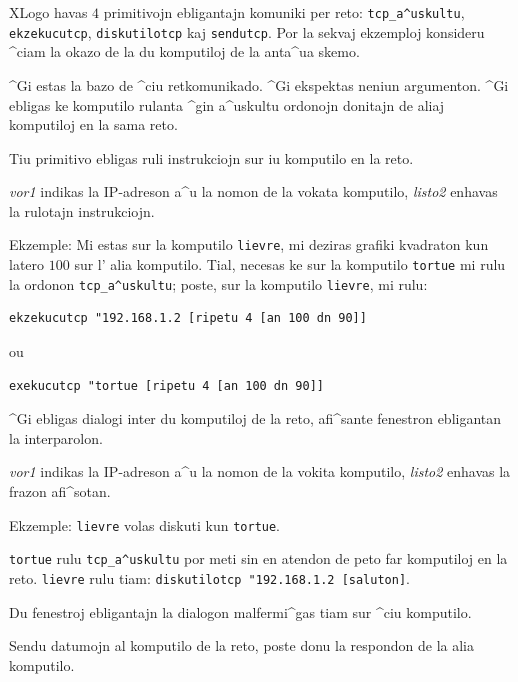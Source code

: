 XLogo havas $4$ primitivojn ebligantajn komuniki per reto:
\texttt{tcp\_a^uskultu}, \texttt{ekzekucutcp}, \texttt{diskutilotcp}
kaj \texttt{sendutcp}.  Por la sekvaj ekzemploj konsideru ^ciam la
okazo de la du komputiloj de la anta^ua skemo.


^Gi estas la bazo de ^ciu retkomunikado.  ^Gi ekspektas neniun
argumenton.  ^Gi ebligas ke komputilo rulanta ^gin a^uskultu ordonojn
donitajn de aliaj komputiloj en la sama reto.


Tiu primitivo ebligas ruli instrukciojn sur iu komputilo en la reto.

\textit{vor1} indikas la IP-adreson a^u la nomon de la vokata komputilo,
\textit{listo2} enhavas la rulotajn instrukciojn.

Ekzemple: Mi estas sur la komputilo \texttt{lievre}, mi deziras
grafiki kvadraton kun latero $100$ sur l' alia komputilo.  Tial,
necesas ke sur la komputilo \texttt{tortue} mi rulu la ordonon
\texttt{tcp\_a^uskultu}; poste, sur la komputilo \texttt{lievre}, mi
rulu:
\begin{verbatim}
ekzekucutcp "192.168.1.2 [ripetu 4 [an 100 dn 90]]
\end{verbatim}
ou 
\begin{verbatim}
exekucutcp "tortue [ripetu 4 [an 100 dn 90]]
\end{verbatim}


^Gi ebligas dialogi inter du komputiloj de la reto, afi^sante
fenestron ebligantan la interparolon.

\textit{vor1} indikas la IP-adreson a^u la nomon de la vokita
komputilo, \textit{listo2} enhavas la frazon afi^sotan.

Ekzemple: \texttt{lievre} volas diskuti kun \texttt{tortue}.

\texttt{tortue} rulu \texttt{tcp\_a^uskultu} por meti sin en atendon
de peto far komputiloj en la reto.  \texttt{lievre} rulu tiam:
\texttt{diskutilotcp~"192.168.1.2~[saluton]}.

Du fenestroj ebligantajn la dialogon malfermi^gas tiam sur ^ciu
komputilo.


Sendu datumojn al komputilo de la reto, poste donu la respondon de la
alia komputilo.

